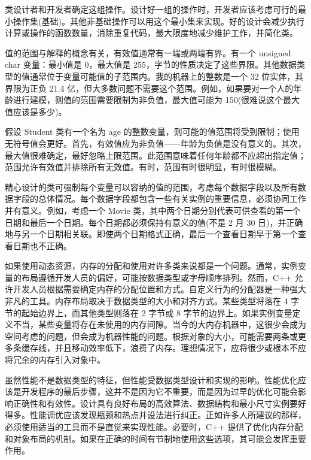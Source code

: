 类设计者和开发者确定这组操作。设计好一组的操作时，开发者应该考虑可行的最小操作集(基础)。其他非基础操作可以用这个最小集来实现。好的设计会减少执行计算或操作的函数数量，消除重复代码，最大限度地减少维护工作，并简化类。


值的范围与解释的概念有关，有效值通常有一端或两端有界。有一个 unsigned char 变量：最小值是 0，最大值是 255，字节的性质决定了这些界限。其他数据类型的值通常位于变量可能值的子范围内。我的机器上的整数是一个 32 位实体，其界限为正负 21.4 亿，但大多数问题不需要这个范围。例如，如果要对一个人的年龄进行建模，则值的范围需要限制为非负值，最大值可能为 150(很难说这个最大值应该是多少)。

假设 Student 类有一个名为 age 的整数变量，则可能的值范围将受到限制；使用无符号值会更好。首先，有效值应为非负值——年龄为负值是没有意义的。其次，最大值很难确定，最好忽略上限范围。此范围意味着任何年龄都不应超出指定值；范围允许有效值并排除所有无效值。有时，范围有时很明显，有时很模糊。

精心设计的类可强制每个变量可以容纳的值的范围，考虑每个数据字段以及所有数据字段的总体情况。每个数据字段都包含一些有关实例的重要信息，必须协同工作并有意义。例如，考虑一个 Movie 类，其中两个日期分别代表可供查看的第一个日期和最后一个日期。每个日期都必须保持有意义的值(不是 2 月 30 日)，并正确地与另一个日期相关联。即使两个日期格式正确，最后一个查看日期早于第一个查看日期也不正确。


如果使用动态资源，内存的分配和使用对许多类来说都是一个问题。通常，实例变量的布局遵循开发人员的偏好，可能按数据类型或字母顺序排列。然而，C++ 允许开发人员根据需要确定内存的分配位置和方式。自定义行为的分配器是一种强大非凡的工具。内存布局取决于数据类型的大小和对齐方式。某些类型将落在 4 字节的起始边界上，而其他类型则落在 2 字节或 8 字节的边界上。如果实例变量定义不当，某些变量将存在未使用的内存间隙。当今的大内存机器中，这很少会成为空间考虑的问题，但会成为机器性能的问题。根据对象的大小，可能需要两条或更多条缓存线，并且移动效率低下，浪费了内存。理想情况下，应将很少或根本不应将冗余的内存引入对象中。


虽然性能不是数据类型的特征，但性能受数据类型设计和实现的影响。性能优化应该是开发程序的最后步骤，这并不是因为它不重要，而是因为过早的优化可能会影响正确性和有效性。设计具有良好布局的高效算法、数据结构和最小尺寸实例要好得多。性能调优应该发现瓶颈和热点并设法进行纠正。正如许多人所建议的那样，必须使用适当的工具而不是直觉来实现性能。必要时，C++ 提供了优化内存分配和对象布局的机制。如果在正确的时间有节制地使用这些选项，其可能会发挥重要作用。
